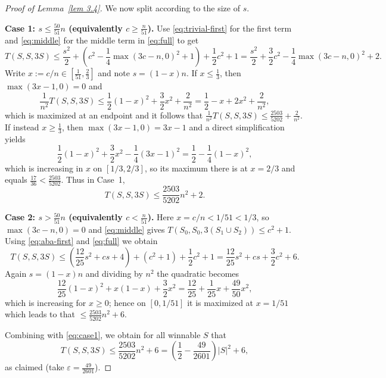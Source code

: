 \documentclass[12pt, notitlepage]{amsart}
\numberwithin{equation}{section}
\theoremstyle{remark}
\theoremstyle{definition}
\theoremstyle{remark}
\numberwithin{equation}{section}
\begin{document}
\begin{proof}[Proof of Lemma~\ref{lem 3.4}]
We now split according to the size of $s$.

\medskip
\noindent\textbf{Case 1: $s\le \frac{50}{51}n$ (equivalently $c\ge \frac{n}{51}$).}
Use \eqref{eq:trivial-first} for the first term and \eqref{eq:middle} for the middle term in \eqref{eq:full} to get
\[
T(S,S,3S)\le \frac{s^2}{2}+\left(c^2-\frac14\max(3c-n,0)^2+1\right)+\frac12c^2+1
= \frac{s^2}{2}+\frac32c^2-\frac14\max(3c-n,0)^2+2.
\]
Write $x:=c/n\in\left[\frac{1}{51},\frac{2}{3}\right]$ and note $s=(1-x)n$.
If $x\le \frac13$, then $\max(3x-1,0)=0$ and
\[
\frac{1}{n^2}T(S,S,3S)\le \frac12(1-x)^2+\frac32x^2+\frac{2}{n^2}
=\frac12-x+2x^2+\frac{2}{n^2},
\]
which is maximized at an endpoint and it follows that  $\frac{1}{n^2}T(S,S,3S)\le \frac{2503}{5202}+\frac{2}{n^2}$.
If instead $x\ge \frac13$, then $\max(3x-1,0)=3x-1$ and a direct simplification yields
\[
\frac12(1-x)^2+\frac32x^2-\frac14(3x-1)^2
=\frac12-\frac14(1-x)^2,
\]
which is increasing in $x$ on $[1/3,2/3]$, so its maximum there is at $x=2/3$ and equals $\frac{17}{36}<\frac{2503}{5202}$.
Thus in Case~1,
\begin{equation}
\label{eq:case1}
T(S,S,3S)\le \frac{2503}{5202}n^2+2.
\end{equation}

\medskip
\noindent\textbf{Case 2: $s>\frac{50}{51}n$ (equivalently $c<\frac{n}{51}$).}
Here $x=c/n<1/51<1/3$, so $\max(3c-n,0)=0$ and \eqref{eq:middle} gives
$T(S_0,S_0,3(S_1\cup S_2))\le c^2+1$.
Using \eqref{eq:aba-first} and \eqref{eq:full} we obtain
\[
T(S,S,3S)\le \left(\frac{12}{25}s^2+cs+4\right)+(c^2+1)+\frac12c^2+1
= \frac{12}{25}s^2+cs+\frac32c^2+6.
\]
Again $s=(1-x)n$ and dividing by $n^2$ the quadratic becomes
\[
\frac{12}{25}(1-x)^2+x(1-x)+\frac32x^2
=\frac{12}{25}+\frac{1}{25}x+\frac{49}{50}x^2,
\]
which is increasing for $x\ge 0$; hence on $[0,1/51]$ it is maximized at $x=1/51$ which leads to that $\le \frac{2503}{5202}n^2+6.$

Combining with \eqref{eq:case1}, we obtain for all winnable $S$ that
\[
T(S,S,3S)\le \frac{2503}{5202}n^2+6 = \left(\frac12-\frac{49}{2601}\right)|S|^2+6,
\]
as claimed (take $\varepsilon=\frac{49}{2601}$).
\end{proof}




{}
\end{document}
